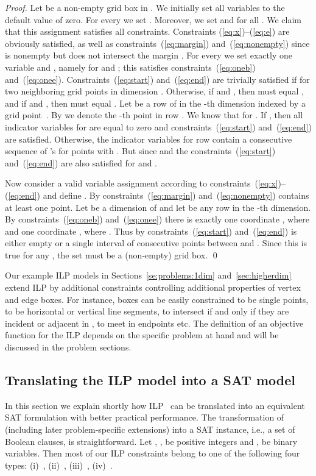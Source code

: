 \documentclass[runningheads]{llncs}
\newcounter{constr}
\begin{document}
\begin{proof}
  Let  be a non-empty
grid box in . We initially set all variables to the
default value of zero. For every  we set
. Moreover, we set  and
 for all . We claim that this
assignment satisfies all constraints. Constraints
(\ref{eq:x})--(\ref{eq:e}) are obviously satisfied, as well as 
constraints~(\ref{eq:margin}) and~(\ref{eq:nonempty}) since  is
nonempty but does not intersect the margin . For every  we set exactly one
variable  and , namely for  and
; this satisfies constraints~(\ref{eq:oneb})
and~(\ref{eq:onee}). Constraints~(\ref{eq:start}) and~(\ref{eq:end})
are trivially satisfied if   for
two neighboring grid points in dimension . Otherwise, if
 and , then
 must equal , and if  and
, then  must equal .
  Let  be a row of  in the -th
dimension indexed by a grid point~. By  we
denote the -th point  in row . We know that   
for . If
, then all indicator variables for
 are equal to zero and constraints~(\ref{eq:start})
and~(\ref{eq:end}) are satisfied. Otherwise, the indicator variables
for row  contain a consecutive sequence of 's for
points  with . But since
 and  the
constraints~(\ref{eq:start}) and~(\ref{eq:end}) are also satisfied for
 and .

Now consider a valid variable assignment according to
constraints~(\ref{eq:x})--(\ref{eq:end}) and define . By constraints~(\ref{eq:margin})
and~(\ref{eq:nonempty})  contains at least one point. Let  be a dimension of  and let  be any
row in the -th dimension. By constraints~(\ref{eq:oneb})
and~(\ref{eq:onee}) there is exactly one coordinate , where
 and one coordinate , where . Thus by
constraints~(\ref{eq:start}) and~(\ref{eq:end}) 
is either empty or a single interval of consecutive points between
 and . Since this is true for
any , the set  must be a (non-empty) grid box. \qed
\end{proof}


Our example ILP models in Sections~\ref{se:problems:1dim}
and~\ref{sec:higherdim} extend ILP  by additional
constraints controlling additional properties of vertex and edge
boxes. For instance, boxes can be easily constrained to be single
points, to be horizontal or vertical line segments, to intersect if
and only if they are incident or adjacent in , to meet in endpoints
etc.
The definition of an objective function for the ILP depends on the
specific problem at hand and will be discussed in the problem
sections.
\subsection{Translating the ILP model into a SAT
model}\label{sec:satmodel}
In this section we explain shortly how ILP~ can be
translated into an equivalent SAT formulation with better
practical performance. The transformation of 
(including later problem-specific extensions) into a SAT instance,
i.e., a set of Boolean clauses, is straightforward. Let , , be positive integers and ,  be binary variables. Then most of our ILP
constraints belong to one of the following four types:
(i)~, 
(ii)~\mbox{,} 
(iii)~,
(iv)~. 
\end{document}
